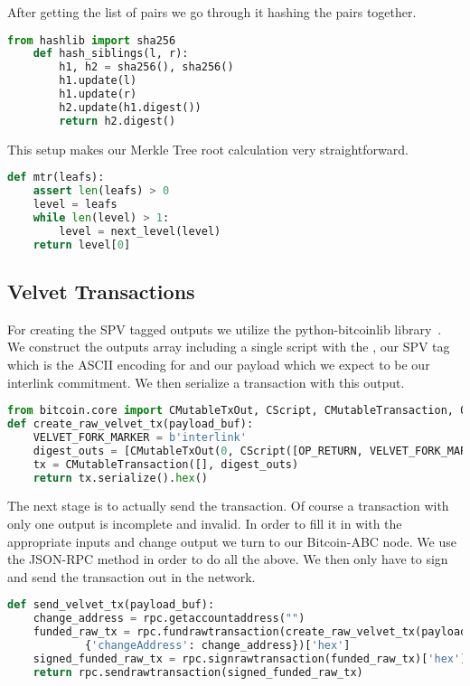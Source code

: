 After getting the list of pairs we go through it hashing the pairs together.

\begin{lstlisting}[language=Python]
    from hashlib import sha256
    def hash_siblings(l, r):
        h1, h2 = sha256(), sha256()
        h1.update(l)
        h1.update(r)
        h2.update(h1.digest())
        return h2.digest()
\end{lstlisting}

This setup makes our Merkle Tree root calculation very straightforward.

\begin{lstlisting}[language=Python]
def mtr(leafs):
    assert len(leafs) > 0
    level = leafs
    while len(level) > 1:
        level = next_level(level)
    return level[0]
\end{lstlisting}

\subsection{Velvet Transactions}

For creating the SPV tagged outputs we utilize the python-bitcoinlib library~\cite{python-bitcoinlib}. We construct the outputs array including a single script with the , our SPV tag which is the ASCII encoding for  and our payload which we expect to be our interlink commitment. We then serialize a transaction with this output.

\begin{lstlisting}[language=Python]
from bitcoin.core import CMutableTxOut, CScript, CMutableTransaction, OP_RETURN
def create_raw_velvet_tx(payload_buf):
    VELVET_FORK_MARKER = b'interlink'
    digest_outs = [CMutableTxOut(0, CScript([OP_RETURN, VELVET_FORK_MARKER, payload_buf]))]
    tx = CMutableTransaction([], digest_outs)
    return tx.serialize().hex()
\end{lstlisting}

The next stage is to actually send the transaction. Of course a transaction with only one output is incomplete and invalid. In order to fill it in with the appropriate inputs and change output we turn to our Bitcoin-ABC node. We use the  JSON-RPC method in order to do all the above. We then only have to sign and send the transaction out in the network.

\begin{lstlisting}[language=Python]
def send_velvet_tx(payload_buf):
    change_address = rpc.getaccountaddress("")
    funded_raw_tx = rpc.fundrawtransaction(create_raw_velvet_tx(payload_buf),
            {'changeAddress': change_address})['hex']
    signed_funded_raw_tx = rpc.signrawtransaction(funded_raw_tx)['hex']
    return rpc.sendrawtransaction(signed_funded_raw_tx)
\end{lstlisting}

